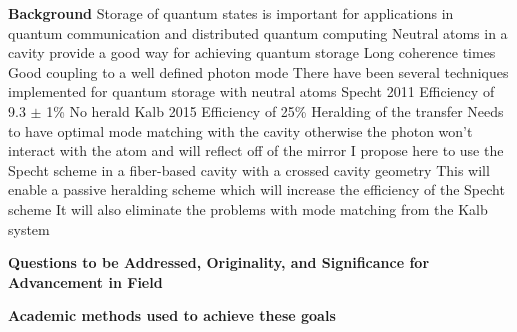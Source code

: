 \documentclass[a4paper]{article}
\begin{document}
\begin{outline}[enumerate]
\1 \textbf{Background}
	\2 Storage of quantum states is important for applications in quantum communication and distributed quantum computing
    \2 Neutral atoms in a cavity provide a good way for achieving quantum storage
    	\3 Long coherence times
        \3 Good coupling to a well defined photon mode
    \2 There have been several techniques implemented for quantum storage with neutral atoms
    	\3 Specht 2011
        	\4 Efficiency of 9.3 $\pm$ 1\%
            \4 No herald
        \3 Kalb 2015
        	\4 Efficiency of 25\%
            \4 Heralding of the transfer
            \4 Needs to have optimal mode matching with the cavity otherwise the photon won't interact with the atom and will reflect off of the mirror
    \2 I propose here to use the Specht scheme in a fiber-based cavity  with a crossed cavity geometry
    	\3 This will enable a passive heralding scheme which will increase the efficiency of the Specht scheme
        \3 It will also eliminate the problems with mode matching from the Kalb system
        
    
\1 \textbf{Questions to be Addressed, Originality, and Significance for Advancement in Field}


\1 \textbf{Academic methods used to achieve these goals}
    
\end{outline}


\end{document}
